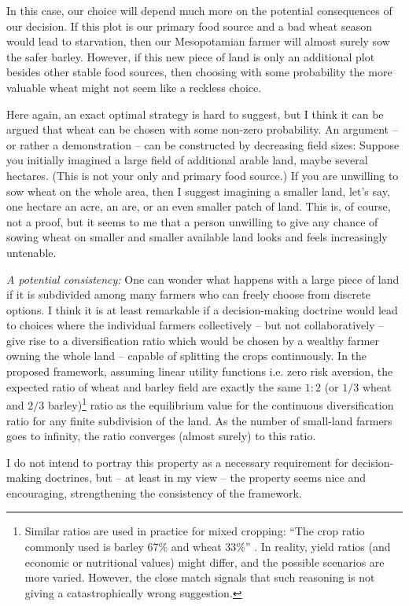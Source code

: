 \documentclass{article}
\begin{document}
In this case, our choice will depend much more on the potential consequences of our decision. If this plot is our primary food source and a bad wheat season would lead to starvation, then our Mesopotamian farmer will almost surely sow the safer barley. However, if this new piece of land is only an additional plot besides other stable food sources, then choosing with some probability the more valuable wheat might not seem like a reckless choice.

Here again, an exact optimal strategy is hard to suggest, but I think it can be argued that wheat can be chosen with some non-zero probability.
An argument -- or rather a demonstration -- can be constructed by decreasing field sizes:
Suppose you initially imagined a large field of additional arable land, maybe several hectares. (This is not your only and primary food source.) If you are unwilling to sow wheat on the whole area, then I suggest imagining a smaller land, let's say, one hectare an acre, an are, or an even smaller patch of land.
This is, of course, not a proof, but it seems to me that a person unwilling to give any chance of sowing wheat on smaller and smaller available land looks and feels increasingly untenable.

{\it A potential consistency:}
One can wonder what happens with a large piece of land if it is subdivided among many farmers who can freely choose from discrete options. I think it is at least remarkable if a decision-making doctrine would lead to choices where the individual farmers collectively -- but not collaboratively -- give rise to a diversification ratio which would be chosen by a wealthy farmer owning the whole land -- capable of splitting the crops continuously.
In the proposed framework, assuming linear utility functions i.e. zero risk aversion, the expected ratio of wheat and barley field are exactly the same $1:2$ (or $1/3$ wheat and $2/3$ barley)\footnote{Similar ratios are used in practice for mixed cropping: ``The crop ratio commonly used is barley 67\% and wheat 33\%'' \cite{thesis:MixedCropping}. In reality, yield ratios (and economic or nutritional values) might differ, and the possible scenarios are more varied. However, the close match signals that such reasoning is not giving a catastrophically wrong suggestion.} ratio as the equilibrium value for the continuous diversification ratio for any finite subdivision of the land. As the number of small-land farmers goes to infinity, the ratio converges (almost surely) to this ratio.

I do not intend to portray this property as a necessary requirement for decision-making doctrines, but -- at least in my view -- the property seems nice and encouraging, strengthening the consistency of the framework.
\end{document}
